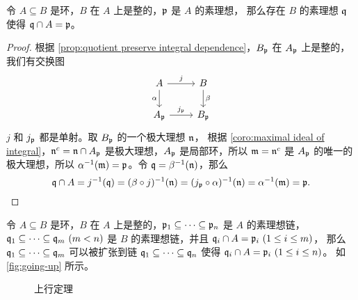 \begin{theorem}\label{thm:lying over}
  令 $A\subseteq B$ 是环，$B$ 在 $A$ 上是整的，$\mathfrak{p}$ 是 $A$ 的素理想，
  那么存在 $B$ 的素理想 $\mathfrak{q}$ 使得 $\mathfrak{q}\cap A=\mathfrak{p}$。
\end{theorem}
\begin{proof}
  根据 \autoref{prop:quotient preserve integral dependence}，$B_{\mathfrak{p}}$
  在 $A_{\mathfrak{p}}$ 上是整的，我们有交换图
  \[
    \begin{tikzcd}
      A\arrow[r,"j"]\arrow[d,"\alpha"'] & B\arrow[d,"\beta"] \\
      A_{\ideal p}\arrow[r,"j_{\ideal p}"] & B_{\ideal p}
    \end{tikzcd}  
  \]
  $j$ 和 $j_{\mathfrak{p}}$ 都是单射。取 $B_{\mathfrak{p}}$ 的一个极大理想 $\mathfrak{n}$，
  根据 \autoref{coro:maximal ideal of integral}，$\mathfrak{n}^c=\mathfrak{n}\cap A_{\mathfrak{p}}$
  是极大理想，$A_{\mathfrak{p}}$ 是局部环，所以 $\mathfrak{m}=\mathfrak{n}^c$ 是 $A_{\mathfrak{p}}$
  的唯一的极大理想，所以 $\alpha^{-1}(\mathfrak{m})=\mathfrak{p}$。令 $\mathfrak{q}=\beta^{-1}(\mathfrak{n})$，那么
  \[
    \mathfrak{q}\cap A=j^{-1}(\mathfrak{q})=(\beta\circ j)^{-1}(\mathfrak{n})=
    (j_{\mathfrak{p}}\circ \alpha)^{-1}(\mathfrak{n})=\alpha^{-1}(\mathfrak{m})=\mathfrak{p}.\qedhere
  \]
\end{proof}

\begin{theorem}[上行定理]
  令 $A\subseteq B$ 是环，$B$ 在 $A$ 上是整的，$\mathfrak{p}_1\subseteq\cdots\subseteq\mathfrak{p}_n$
  是 $A$ 的素理想链，$\mathfrak{q}_1\subseteq\cdots\subseteq\mathfrak{q}_m\ (m< n)$ 是 
  $B$ 的素理想链，并且 $\ideal q_i\cap A=\ideal p_i\ (1\leq i\leq m)$，
  那么 $\mathfrak{q}_1\subseteq\cdots\subseteq\mathfrak{q}_m$ 可以被扩张到链
  $\mathfrak{q}_1\subseteq\cdots\subseteq\mathfrak{q}_n$ 使得 $\ideal q_i\cap A=\ideal p_i\ (1\leq i\leq n)$。
  如 \autoref{fig:going-up} 所示。
\end{theorem}

\begin{figure}[htb]
    \centering
    \caption{上行定理}\label{fig:going-up}
\end{figure}

